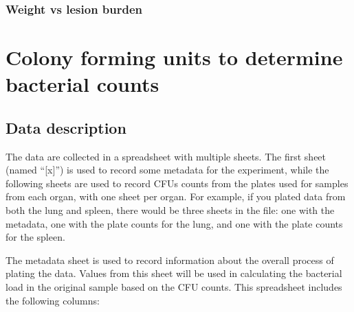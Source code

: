 \documentclass[
]{book}
\begin{document}
\hypertarget{weight-vs-lesion-burden}{%
\subsection{Weight vs lesion burden}\label{weight-vs-lesion-burden}}

\hypertarget{colony-forming-units-to-determine-bacterial-counts}{%
\chapter{Colony forming units to determine bacterial counts}\label{colony-forming-units-to-determine-bacterial-counts}}

\hypertarget{data-description}{%
\section{Data description}\label{data-description}}

The data are collected in a spreadsheet with multiple sheets. The first sheet
(named ``{[}x{]}'') is used to record some metadata for the experiment, while the
following sheets are used to record CFUs counts from the plates used for samples
from each organ, with one sheet per organ. For example, if you plated data
from both the lung and spleen, there would be three sheets in the file: one
with the metadata, one with the plate counts for the lung, and one with the
plate counts for the spleen.

The metadata sheet is used to record information about the overall process of
plating the data. Values from this sheet will be used in calculating the bacterial
load in the original sample based on the CFU counts. This spreadsheet includes
the following columns:
\end{document}
